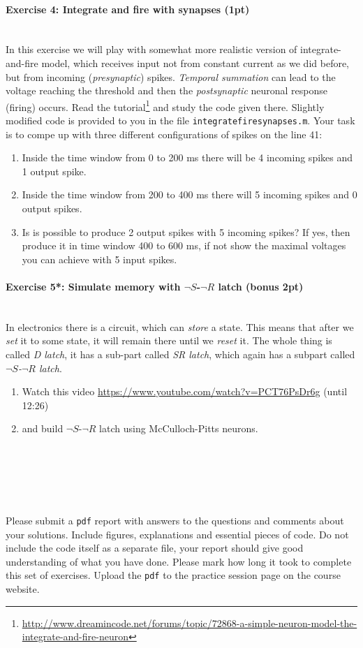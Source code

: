\documentclass[a4paper,11pt]{article}
\newenvironment{exercise}[3]{\paragraph{Exercise #1: #2 (#3pt)}\ \\}{
\medskip}
\begin{document}
%
%
\begin{exercise}{4}{Integrate and fire with synapses}{1}
In this exercise we will play with somewhat more realistic version of integrate-and-fire model, which receives input not from constant current as we did before, but from incoming (\emph{presynaptic}) spikes. \emph{Temporal summation} can lead to the voltage reaching the threshold and then the \emph{postsynaptic} neuronal response (firing) occurs. Read the tutorial\footnote{\url{http://www.dreamincode.net/forums/topic/72868-a-simple-neuron-model-the-integrate-and-fire-neuron}} and study the code given there. Slightly modified code is provided to you in the file \texttt{integratefiresynapses.m}. Your task is to compe up with three different configurations of spikes on the line 41:
\begin{enumerate}
	\item Inside the time window from 0 to 200 ms there will be 4 incoming spikes and 1 output spike.
	\item Inside the time window from 200 to 400 ms there will 5 incoming spikes and 0 output spikes.
	\item Is is possible to produce 2 output spikes with 5 incoming spikes? If yes, then produce it in time window 400 to 600 ms, if not show the maximal voltages you can achieve with 5 input spikes.
\end{enumerate}
\end{exercise}


%
%
\begin{exercise}{5*}{Simulate memory with $\neg S$-$\neg R$ latch}{bonus 2}
In electronics there is a circuit, which can \emph{store} a state. This means that after we \emph{set} it to some state, it will remain there until we \emph{reset} it. The whole thing is called \emph{D latch}, it has a sub-part called \emph{SR latch}, which again has a subpart called \emph{$\neg S$-$\neg R$ latch}.
\begin{enumerate}
\itemsep 0em
	\item Watch this video \url{https://www.youtube.com/watch?v=PCT76PsDr6g} (until 12:26)
	\item and build $\neg S$-$\neg R$ latch using McCulloch-Pitts neurons. 
\end{enumerate}
\end{exercise}


\ \\
\ \\
\ \\
\ \\
\ \\
Please submit a \texttt{pdf} report with answers to the questions and comments about your solutions. Include figures, explanations and essential pieces of code. Do not include the code itself as a separate file, your report should give good understanding of what you have done. Please mark how long it took to complete this set of exercises. Upload the \texttt{pdf} to the practice session page on the course website.
\end{document}
